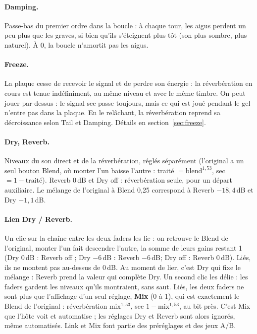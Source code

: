 \documentclass[a4paper,11pt]{article}
\newcommand{\dB}{\,dB}
\begin{document}
\paragraph{Damping.} Passe-bas du premier ordre dans la boucle : à chaque tour, les aigus perdent
un peu plus que les graves, si bien qu'ils s'éteignent plus tôt (son plus sombre, plus
naturel). À 0, la boucle n'amortit pas les aigus.

\paragraph{Freeze.} La plaque cesse de recevoir le signal et de perdre son énergie : la
réverbération en cours est tenue indéfiniment, au même niveau et avec le même timbre. On peut
jouer par-dessus : le signal sec passe toujours, mais ce qui est joué pendant le gel n'entre
pas dans la plaque. En le relâchant, la réverbération reprend sa décroissance selon Tail et
Damping. Détails en section~\ref{sec:freeze}.

\paragraph{Dry, Reverb.} Niveaux du son direct et de la réverbération, réglés séparément
(l'original a un seul bouton Blend, où monter l'un baisse l'autre : traité $=
\mathrm{blend}^{1{,}53}$, sec $= 1 - \text{traité}$). Reverb 0\dB{} et Dry off : réverbération
seule, pour un départ auxiliaire. Le mélange de l'original à Blend 0,25 correspond à Reverb
$-18{,}4$\dB{} et Dry $-1{,}1$\dB.

\paragraph{Lien Dry / Reverb.} Un clic sur la chaîne entre les deux faders les lie : on retrouve
le Blend de l'original, monter l'un fait descendre l'autre, la somme de leurs gains restant 1
(Dry 0\dB{} : Reverb off ; Dry $-6$\dB{} : Reverb $-6$\dB ; Dry off : Reverb 0\dB). Liés,
ils ne montent pas au-dessus de 0\dB. Au moment de lier, c'est Dry qui fixe le mélange : Reverb
prend la valeur qui complète Dry. Un second clic les délie : les faders gardent les niveaux
qu'ils montraient, sans saut. Liés, les deux faders ne sont plus que l'affichage d'un seul
réglage, \textbf{Mix} (0 à 1), qui est exactement le Blend de l'original : réverbération
$\mathrm{mix}^{1{,}53}$, sec $1 - \mathrm{mix}^{1{,}53}$, au bit près. C'est Mix que l'hôte voit
et automatise ; les réglages Dry et Reverb sont alors ignorés, même automatisés. Link et Mix
font partie des préréglages et des jeux A/B.
\end{document}
